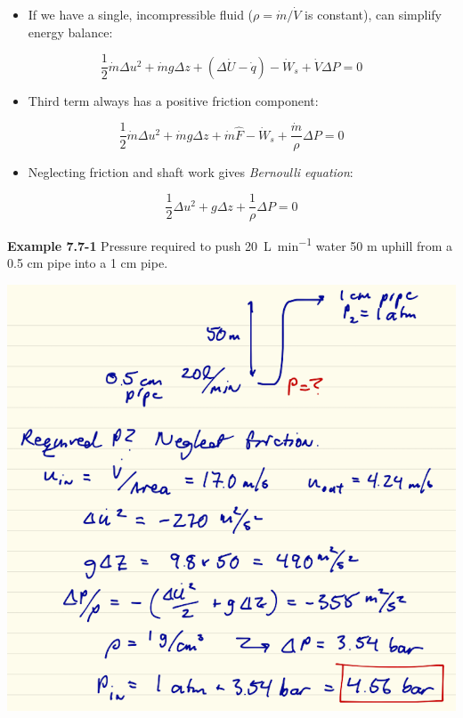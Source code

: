 \documentclass[11pt]{article}
\begin{document}
\begin{itemize}
\item If we have a single, incompressible fluid (\( \rho = \dot{m}/\dot{V} \) is constant), can simplify energy balance:
\end{itemize}

\[ \frac{1}{2}\dot{m} \Delta u^{2} + \dot{m}g\Delta z + \left( \Delta\dot{U} - \dot{q}\right) - \dot{W}_{s} + \dot{V}\Delta P = 0\]

\begin{itemize}
\item Third term always has a positive friction component:
\end{itemize}

\[ \frac{1}{2}\dot{m} \Delta u^{2} + \dot{m}g\Delta z + \dot{m}\hat{F} - \dot{W}_{s} + \frac{\dot{m}}{\rho}\Delta P = 0\]

\begin{itemize}
\item Neglecting friction and shaft work gives \emph{Bernoulli equation}:
\end{itemize}

\begin{framed}
\[ \frac{1}{2} \Delta u^{2} + g\Delta z  + \frac{1}{\rho}\Delta P = 0\]
\end{framed}

\begin{framed}
\noindent \textbf{Example 7.7-1} Pressure required to push \SI{20}{\liter\per\minute} water 50 m uphill from a 0.5 cm pipe into a 1 cm pipe.
\end{framed}

\includegraphics[width=.9\linewidth]{./figs/Example771.png}
\end{document}
